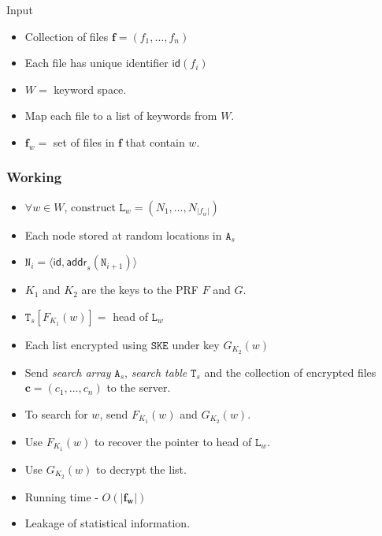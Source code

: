 \documentclass{beamer}
\begin{document}
\begin{frame}{Input}
\begin{itemize}
\item Collection of files \(\mathbf{f} = (f_1, \dotsc, f_n)\)
\item Each file has unique identifier \(\mathsf{id}(f_i)\)
\item \(W = \) keyword space.
\item Map each file to a list of keywords from \(W\).
\item \(\mathbf{f}_w =\) set of files in \(\mathbf{f}\) that contain
	\(w\).
\end{itemize}
\end{frame}

\begin{frame}[allowframebreaks]
\frametitle{Working}
\begin{itemize}
\item \(\forall w \in W\), construct
	\(\mathtt{L}_w = (N_1, \dotsc, N_{|f_w|})\)
\item Each node stored at random locations in \(\mathtt{A}_s\)
\item \(\mathtt{N}_i = \langle \mathsf{id, addr}_s(\mathtt{N}_{i+1}) \rangle\)
\item \(K_1\) and \(K_2\) are the keys to the PRF \(F\) and \(G\).
\item \(\mathtt{T}_s[F_{K_1}(w)] = \) head of \(\mathtt{L}_w\)
\item Each list encrypted using \(\mathtt{SKE}\) under key \(G_{K_2}(w)\)
	\framebreak
\item Send \emph{search array} \(\mathtt{A}_s\),
	\emph{search table} \(\mathtt{T}_s\) and
	the collection of encrypted files \(\mathbf{c} = (c_1, \dotsc, c_n)\)
	to the server.
\item To search for \(w\), send \(F_{K_1}(w)\) and \(G_{K_2}(w)\).
\item Use \(F_{K_1}(w)\) to recover the pointer to head of \(\mathtt{L}_w\).
\item Use \(G_{K_2}(w)\) to decrypt the list.
\item Running time - \(O(|\mathbf{f_w}|)\)
\item Leakage of statistical information.
\end{itemize}
\end{frame}
\end{document}
